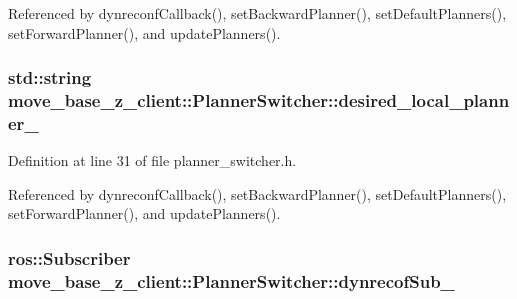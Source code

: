 Referenced by dynreconf\+Callback(), set\+Backward\+Planner(), set\+Default\+Planners(), set\+Forward\+Planner(), and update\+Planners().

\subsubsection[{\texorpdfstring{desired\+\_\+local\+\_\+planner\+\_\+}{desired_local_planner_}}]{\setlength{\rightskip}{0pt plus 5cm}std\+::string move\+\_\+base\+\_\+z\+\_\+client\+::\+Planner\+Switcher\+::desired\+\_\+local\+\_\+planner\+\_\+\hspace{0.3cm}{\ttfamily [private]}}\hypertarget{classmove__base__z__client_1_1PlannerSwitcher_ae47bd6c9c70b27cddcb394f26bb9372d}{}\label{classmove__base__z__client_1_1PlannerSwitcher_ae47bd6c9c70b27cddcb394f26bb9372d}


Definition at line 31 of file planner\+\_\+switcher.\+h.



Referenced by dynreconf\+Callback(), set\+Backward\+Planner(), set\+Default\+Planners(), set\+Forward\+Planner(), and update\+Planners().

\subsubsection[{\texorpdfstring{dynrecof\+Sub\+\_\+}{dynrecofSub_}}]{\setlength{\rightskip}{0pt plus 5cm}ros\+::\+Subscriber move\+\_\+base\+\_\+z\+\_\+client\+::\+Planner\+Switcher\+::dynrecof\+Sub\+\_\+\hspace{0.3cm}{\ttfamily [private]}}\hypertarget{classmove__base__z__client_1_1PlannerSwitcher_a088bde4ce0fece46776a9f4efe417e15}{}\label{classmove__base__z__client_1_1PlannerSwitcher_a088bde4ce0fece46776a9f4efe417e15}


